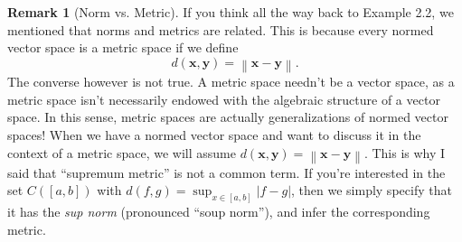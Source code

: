 \documentclass{article}
\newcommand{\x}{\mathbf{x}}
\newcommand{\y}{\mathbf{y}}
\newcommand{\norm}[1]{\left\lVert#1\right\rVert}
\theoremstyle{definition}
\newtheorem{remark}{Remark}[section]
\begin{document}
\begin{remark}[Norm vs. Metric]
If you think all the way back to Example 2.2, we mentioned that norms and metrics are related. This is because every normed vector space is a metric space if we define $$ d(\x,\y)=\norm{\x-\y}.$$ The converse however is not true. A metric space needn't be a vector space, as a metric space isn't necessarily endowed with the algebraic structure of a vector space. In this sense, metric spaces are actually generalizations of normed vector spaces! When we have a normed vector space and want to discuss it in the context of a metric space, we will assume $ d(\x,\y)=\norm{\x-\y}.$ This is why I said that ``supremum metric'' is not a common term. If you're interested in the set $ C([a,b]) $ with $ d(f,g)=\sup_{x\in [a,b]}|f-g| $, then we simply specify that it has the \textit{\color{red}sup norm} (pronounced ``soup norm''), and infer the corresponding metric. 
\end{remark}
\end{document}
